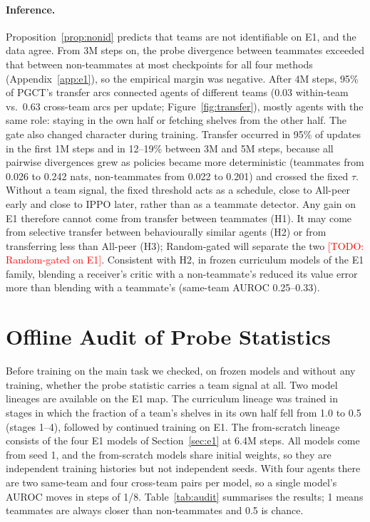 \documentclass{article}
\theoremstyle{remark}
\newcommand{\todo}[1]{\textcolor{red}{[TODO: #1]}}
\newcommand{\ours}{PGCT}
\begin{document}
\paragraph{Inference.} Proposition~\ref{prop:nonid} predicts that teams are not identifiable on E1, and the data agree. From
3M steps on, the probe divergence between teammates exceeded that between non-teammates at most checkpoints for all four
methods (Appendix~\ref{app:e1}), so the empirical margin was negative. After 4M steps, 95\% of \ours{}'s transfer arcs connected agents
of different teams (0.03 within-team vs.\ 0.63 cross-team arcs per update; Figure~\ref{fig:transfer}), mostly agents with the
same role: staying in the own half or fetching shelves from the other half. The gate also changed character during training.
Transfer occurred in 95\% of updates in the first 1M steps and in 12--19\% between 3M and 5M steps, because all pairwise
divergences grew as policies became more deterministic (teammates from 0.026 to 0.242 nats, non-teammates from 0.022 to 0.201)
and crossed the fixed $\tau$. Without a team signal, the fixed threshold acts as a schedule, close to All-peer early and close
to IPPO later, rather than as a teammate detector. Any gain on E1 therefore cannot come from transfer between teammates (H1).
It may come from selective transfer between behaviourally similar agents (H2) or from transferring less than All-peer (H3);
Random-gated will separate the two \todo{Random-gated on E1}. Consistent with H2, in frozen curriculum models of the E1 family,
blending a receiver's critic with a non-teammate's reduced its value error more than blending with a teammate's (same-team
AUROC 0.25--0.33).

\section{Offline Audit of Probe Statistics}
\label{sec:audit}
Before training on the main task we checked, on frozen models and without any training, whether the probe statistic carries a
team signal at all. Two model lineages are available on the E1 map. The curriculum lineage was trained in stages in which the
fraction of a team's shelves in its own half fell from 1.0 to 0.5 (stages 1--4), followed by continued training on E1. The
from-scratch lineage consists of the four E1 models of Section~\ref{sec:e1} at 6.4M steps. All models come from seed 1, and the
from-scratch models share initial weights, so they are independent training histories but not independent seeds. With four
agents there are two same-team and four cross-team pairs per model, so a single model's AUROC moves in steps of 1/8.
Table~\ref{tab:audit} summarises the results; 1 means teammates are always closer than non-teammates and 0.5 is chance.
\end{document}
